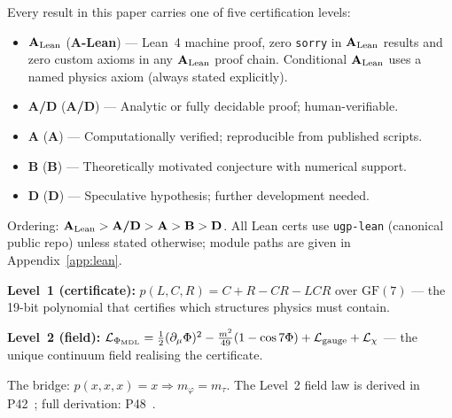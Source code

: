 \documentclass[11pt]{article}
\theoremstyle{remark}
\newcommand{\PHIMDL}{\ensuremath{\Phi_{\mathrm{MDL}}}}
\newcommand{\CatA}{\textbf{A}}
\newcommand{\CatAL}{\ensuremath{\textbf{A}_{\rm Lean}}}
\newcommand{\CatAD}{\textbf{A/D}}
\newcommand{\CatB}{\textbf{B}}
\newcommand{\CatD}{\textbf{D}}
\begin{document}
\tableofcontents

\clearpage
\begin{tcolorbox}[colback=gray!8,colframe=gray!50,title=Claim-Strength Taxonomy,
  fonttitle=\bfseries,breakable]
\small
Every result in this paper carries one of five certification levels:
\begin{itemize}[leftmargin=1.8em,itemsep=2pt,topsep=2pt]
  \item \CatAL{} (\textbf{A-Lean}) --- Lean~4 machine proof, zero \texttt{sorry} in \CatAL{} results
    and zero custom axioms in any \CatAL{} proof chain.
    Conditional \CatAL{} uses a named physics axiom (always stated explicitly).
  \item \CatAD{} (\textbf{A/D}) --- Analytic or fully decidable proof; human-verifiable.
  \item \CatA{} (\textbf{A}) --- Computationally verified; reproducible from published scripts.
  \item \CatB{} (\textbf{B}) --- Theoretically motivated conjecture with numerical support.
  \item \CatD{} (\textbf{D}) --- Speculative hypothesis; further development needed.
\end{itemize}
Ordering: $\CatAL > \CatAD > \CatA > \CatB > \CatD$.
All Lean certs use \texttt{ugp-lean} (canonical public repo) unless stated
otherwise; module paths are given in Appendix~\ref{app:lean}.
\end{tcolorbox}

\medskip
\begin{tcolorbox}[colback=green!4,colframe=green!55!black,
  title={\textbf{The Two Levels of the Framework}},
  fonttitle=\small\bfseries, left=6pt, right=6pt, top=4pt, bottom=4pt]
\small

\medskip\noindent
\textbf{Level~1 (certificate):} $p(L,C,R) = C+R-CR-LCR$ over $\mathrm{GF}(7)$
--- the 19-bit polynomial that certifies which structures physics must contain.

\medskip\noindent
\textbf{Level~2 (field):} $\mathcal{L}_{\PHIMDL} = \tfrac{1}{2}(\partial_\mu\Phi)^2 - \frac{m^2}{49}(1-\cos 7\Phi) + \mathcal{L}_{\rm gauge} + \mathcal{L}_\chi$
--- the unique continuum field realising the certificate.

\smallskip\noindent
The bridge: $p(x,x,x)=x \Rightarrow m_\varphi = m_\tau$.
The Level~2 field law is derived in P42~\cite{SpivackPhiMDLField}; full derivation: P48~\cite{SpivackGTECompleteFramework}.
\end{tcolorbox}
\end{document}
